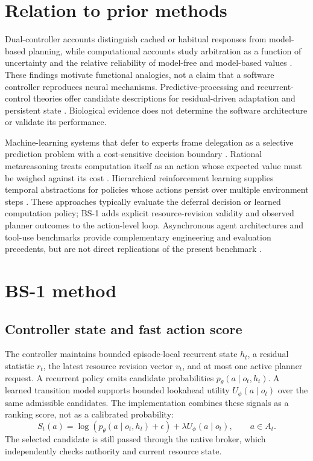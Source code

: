 \documentclass[11pt]{article}
\begin{document}
\section{Relation to prior methods}
Dual-controller accounts distinguish cached or habitual responses from model-based planning, while computational accounts study arbitration as a function of uncertainty and the relative reliability of model-free and model-based values \cite{daw2005,lee2014,kool2016}. These findings motivate functional analogies, not a claim that a software controller reproduces neural mechanisms. Predictive-processing and recurrent-control theories offer candidate descriptions for residual-driven adaptation and persistent state \cite{rao1999,mante2013}. Biological evidence does not determine the software architecture or validate its performance.

Machine-learning systems that defer to experts frame delegation as a selective prediction problem with a cost-sensitive decision boundary \cite{madras2018,mozannar2020}. Rational metareasoning treats computation itself as an action whose expected value must be weighed against its cost \cite{russell1991}. Hierarchical reinforcement learning supplies temporal abstractions for policies whose actions persist over multiple environment steps \cite{sutton1999}. These approaches typically evaluate the deferral decision or learned computation policy; BS-1 adds explicit resource-revision validity and observed planner outcomes to the action-level loop. Asynchronous agent architectures and tool-use benchmarks provide complementary engineering and evaluation precedents, but are not direct replications of the present benchmark \cite{dptagent,toolsandbox}.

\section{BS-1 method}
\subsection{Controller state and fast action score}
The controller maintains bounded episode-local recurrent state $h_t$, a residual statistic $r_t$, the latest resource revision vector $v_t$, and at most one active planner request. A recurrent policy emits candidate probabilities $p_\theta(a\mid o_t,h_t)$. A learned transition model supports bounded lookahead utility $U_\phi(a\mid o_t)$ over the same admissible candidates. The implementation combines these signals as a ranking score, not as a calibrated probability:
\begin{equation}
S_t(a)=\log(p_\theta(a\mid o_t,h_t)+\epsilon)+\lambda U_\phi(a\mid o_t),\qquad a\in A_t.
\end{equation}
The selected candidate is still passed through the native broker, which independently checks authority and current resource state.
\end{document}
